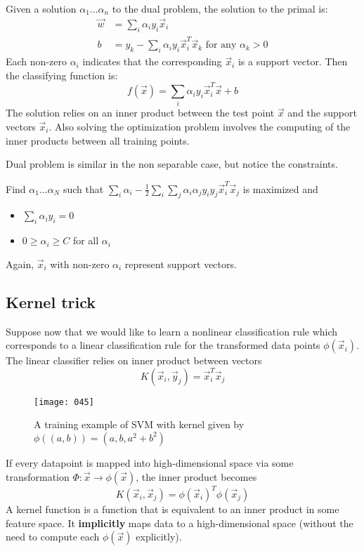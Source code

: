 Given a solution \(\alpha_1...\alpha_n\) to the dual problem, the solution to the primal is:
\begin{align*}
    \vec{w} &= \sum_i \alpha_i y_i \vec{x}_i\\
    b &= y_k - \sum_i \alpha_i y_i \vec{x}_i^T \vec{x}_k \text{ for any } \alpha_k > 0
\end{align*}
Each non-zero \(\alpha_i\) indicates that the corresponding \(\vec{x}_i\) is a support vector. Then the classifying function is:
\begin{equation}
    f(\vec{x}) = \sum_i \alpha_i y_i \vec{x}_i^T \vec{x} + b
\end{equation}
The solution relies on an inner product between the test point \(\vec{x}\) and the support vectors \(\vec{x}_i\). Also solving the optimization problem involves the computing of the inner products between all training points.

Dual problem is similar in the non separable case, but notice the constraints.

Find \(\alpha_1...\alpha_N\) such that \(\sum_i \alpha_i - \frac 1 2 \sum_i \sum_j \alpha_i \alpha_j y_i y_j \vec{x}_i^T \vec{x}_j\) is maximized and
\begin{itemize}
    \item \(\sum_i \alpha_i y_i = 0\)\\
    \item \(0 \geq \alpha_i \geq C\) for all \(\alpha_i\)
\end{itemize}
Again, \(\vec{x}_i\) with non-zero \(\alpha_i\) represent support vectors.

\subsection{Kernel trick}
Suppose now that we would like to learn a nonlinear classification rule which corresponds to a linear classification rule for the transformed data points \(\phi(\vec{x}_i)\). The linear classifier relies on inner product between vectors
\begin{equation}
    K(\vec{x}_i,\vec{y}_j) = \vec{x}_i^T \vec{x}_j
\end{equation}
\begin{figure}[h]
    \centering
    \texttt{[image: 045]}
    \caption{A training example of SVM with kernel given by \(\phi((a,b)) = (a,b,a^2+b^2)\)}
\end{figure}
If every datapoint is mapped into high-dimensional space via some transformation \(\Phi: \vec{x} \to \phi(\vec{x})\), the inner product becomes
\begin{equation}
    K(\vec{x}_i,\vec{x}_j) = \phi(\vec{x}_i)^T \phi(\vec{x}_j)
\end{equation}
A kernel function is a function that is equivalent to an inner product in some feature space. It \textbf{implicitly} maps data to a high-dimensional space (without the need to compute each \(\phi(\vec{x})\) explicitly).

